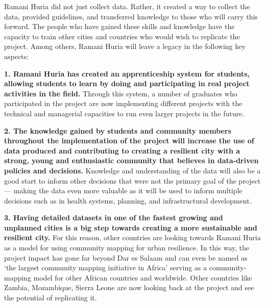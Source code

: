 \documentclass[a4paper,12pt,twoside]{article}
\begin{document}
\begin{multicols}{2}
Ramani Huria did not just collect data. Rather, it created a way to collect the data, provided guidelines, and transferred knowledge to those who will carry this forward. The people who have gained these skills and knowledge have the capacity to train other cities and countries who would wish to replicate the project. Among others, Ramani Huria will leave a legacy in the following key aspects:

   \textbf{ 1. Ramani Huria has created an apprenticeship system for students, allowing students to learn by doing and participating in real project activities in the field.} Through this system, a number of graduates who participated in the project are now implementing different projects with the technical and managerial capacities to run even larger projects in the future.
    
   \textbf{ 2. The knowledge gained by students and community members throughout the implementation of the project will increase the use of data produced and contributing to creating a resilient city with a strong, young and enthusiastic community that believes in data-driven policies and decisions.} Knowledge and understanding of the data will also be a good start to inform other decisions that were not the primary goal of the project --- making the data even more valuable as it will be used to inform multiple decisions such as in health systems, planning, and infrastructural development.
    
    \textbf{3. Having detailed datasets in one of the fastest growing and unplanned cities is a big step towards creating a  more sustainable and resilient city.} For this reason, other countries are looking towards Ramani Huria as a model for using community mapping for urban resilience. In this way, the project impact has gone far beyond Dar es Salaam and can even be named as  ‘the largest community mapping initiative in Africa’ serving as a community-mapping model for other African countries and worldwide. Other countries like Zambia, Mozambique, Sierra Leone are now looking back at the project and see the potential of replicating it.
    \end{multicols}
\end{document}
